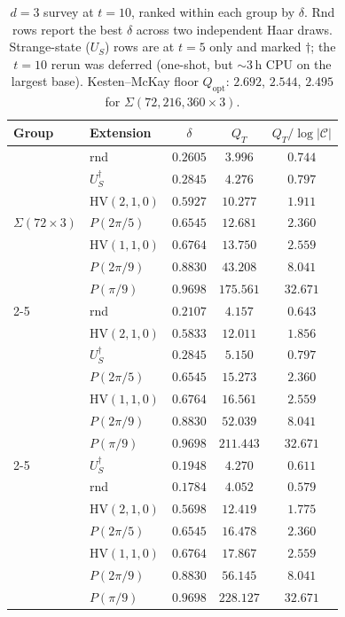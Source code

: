 \documentclass[twocolumn,superscriptaddress,showpacs,nofootinbib,notitlepage,preprintnumbers,secnumarabic,amssymb, nobibnotes, aps, prd]{revtex4-2}
\let\origtoprule\toprule
\let\origbottomrule\bottomrule
\renewcommand{\toprule}{\origtoprule\origtoprule}%
\renewcommand{\bottomrule}{\origbottomrule\origbottomrule}%
\newcommand{\QT}{Q_{T}}              %
\newcommand{\Popt}{Q_{\mathrm{opt}}} %
\newcommand{\HV}[3]{\mathrm{HV}(#1,#2,#3)} %
\newcommand{\Sigmathree}[1]{\Sigma(#1\!\times\!3)} %
\begin{document}
\begin{table}[t]
\centering
\caption{\label{tab:d3_tier1}$d=3$ survey at $t=10$, ranked within each group by $\delta$. Rnd rows report the best $\delta$ across two independent Haar draws. Strange-state ($U_S$) rows are at $t=5$ only and marked $\dagger$; the $t=10$ rerun was deferred (one-shot, but $\sim$3\,h CPU on the largest base). Kesten--McKay floor $\Popt$: $2.692$, $2.544$, $2.495$ for $\Sigmathree{72,216,360}$.}
\begin{tabular}{llccc}
\toprule
Group & Extension & $\delta$ & $\QT$ & $\QT/\log|\mathcal{C}|$ \\
\midrule
\multirow{7}{*}{$\Sigmathree{72}$}
   & rnd               & $0.2605$ & $3.996$   & $0.744$ \\
   & $U_S^\dagger$     & $0.2845$ & $4.276$   & $0.797$ \\
   & $\HV{2}{1}{0}$    & $0.5927$ & $10.277$  & $1.911$ \\
   & $P(2\pi/5)$       & $0.6545$ & $12.681$  & $2.360$ \\
   & $\HV{1}{1}{0}$    & $0.6764$ & $13.750$  & $2.559$ \\
   & $P(2\pi/9)$       & $0.8830$ & $43.208$  & $8.041$ \\
   & $P(\pi/9)$        & $0.9698$ & $175.561$ & $32.671$ \\
\cmidrule(lr){2-5}
\multirow{7}{*}{$\Sigmathree{216}$}
   & rnd               & $0.2107$ & $4.157$   & $0.643$ \\
   & $\HV{2}{1}{0}$    & $0.5833$ & $12.011$  & $1.856$ \\
   & $U_S^\dagger$     & $0.2845$ & $5.150$   & $0.797$ \\
   & $P(2\pi/5)$       & $0.6545$ & $15.273$  & $2.360$ \\
   & $\HV{1}{1}{0}$    & $0.6764$ & $16.561$  & $2.559$ \\
   & $P(2\pi/9)$       & $0.8830$ & $52.039$  & $8.041$ \\
   & $P(\pi/9)$        & $0.9698$ & $211.443$ & $32.671$ \\
\cmidrule(lr){2-5}
\multirow{7}{*}{$\Sigmathree{360}$}
   & $U_S^\dagger$     & $0.1948$ & $4.270$   & $0.611$ \\
   & rnd               & $0.1784$ & $4.052$   & $0.579$ \\
   & $\HV{2}{1}{0}$    & $0.5698$ & $12.419$  & $1.775$ \\
   & $P(2\pi/5)$       & $0.6545$ & $16.478$  & $2.360$ \\
   & $\HV{1}{1}{0}$    & $0.6764$ & $17.867$  & $2.559$ \\
   & $P(2\pi/9)$       & $0.8830$ & $56.145$  & $8.041$ \\
   & $P(\pi/9)$        & $0.9698$ & $228.127$ & $32.671$ \\
\bottomrule
\end{tabular}
\end{table}
\end{document}
